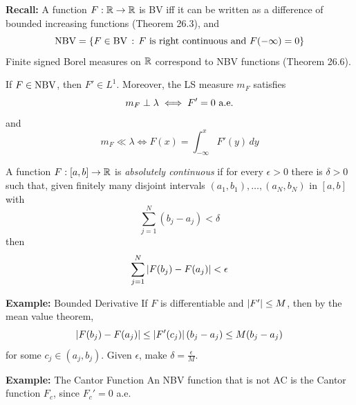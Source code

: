 
\textbf{Recall:} A function $F : \R \to \R$ is BV iff it can be written as a difference of bounded increasing functions (Theorem 26.3), and
\[ \tt{NBV} = \{F \in \tt{BV} \col F \tt{ is right continuous and } F(-\infty) = 0\} \]
Finite signed Borel measures on $\R$ correspond to NBV functions (Theorem 26.6).

\begin{lemma}
    If $F \in \tt{NBV}$, then $F' \in L^1$. Moreover, the LS measure $m_F$ satisfies
    \[ m_F \perp \lambda \iff F' = 0 \tt{ a.e.} \]
    and
    \[ m_F \ll \lambda \iff F(x) = \int_{-\infty}^{x} F'(y)\, dy \]
\end{lemma}

\begin{definition}
    A function $F : [a, b] \to \R$ is \emph{absolutely continuous} if for every $\epsilon > 0$ there is $\delta > 0$ such that, given finitely many disjoint intervals $(a_1, b_1), \ldots, (a_N, b_N)$ in $[a, b]$ with
    \[ \sum_{j = 1}^{N} (b_j - a_j) < \delta \]
    then
    \[ \sum_{j = 1}^{N} \abs{F(b_j) - F(a_j)} < \epsilon \]
\end{definition}

\begin{example}{\textbf{Example:} Bounded Derivative}
    If $F$ is differentiable and $\abs{F'} \leq M$, then by the mean value theorem,
    \[ \abs{F(b_j) - F(a_j)} \leq \abs{F'(c_j)}(b_j - a_j) \leq M(b_j - a_j) \]
    for some $c_j \in (a_j, b_j)$. Given $\epsilon$, make $\delta = \frac{\epsilon}{M}$.
\end{example}

\begin{example}{\textbf{Example:} The Cantor Function}
    An NBV function that is not AC is the Cantor function $F_c$, since $F_c' = 0$ a.e.
\end{example}

